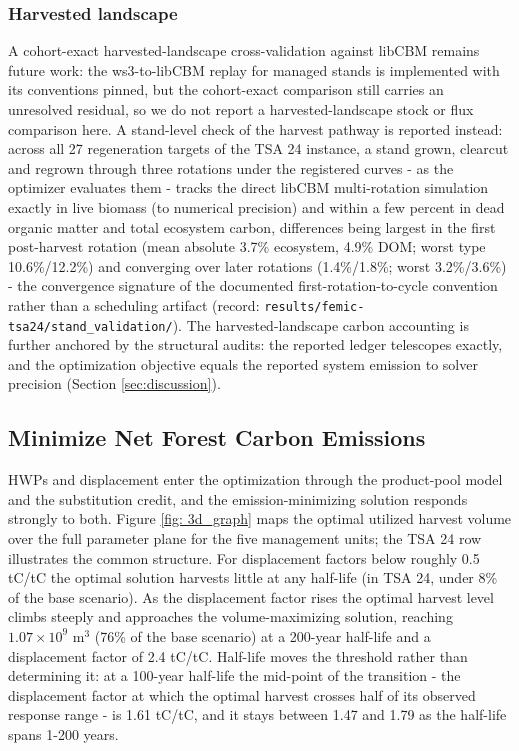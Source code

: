 \documentclass[preprint,12pt,authoryear]{elsarticle}
\begin{document}
\begin{linenumbers}
\subsubsection{Harvested landscape}
A cohort-exact harvested-landscape cross-validation against libCBM remains future work: the ws3-to-libCBM replay for managed stands is implemented with its conventions pinned, but the cohort-exact comparison still carries an unresolved residual, so we do not report a harvested-landscape stock or flux comparison here. A stand-level check of the harvest pathway is reported instead: across all 27 regeneration targets of the TSA 24 instance, a stand grown, clearcut and regrown through three rotations under the registered curves - as the optimizer evaluates them - tracks the direct libCBM multi-rotation simulation exactly in live biomass (to numerical precision) and within a few percent in dead organic matter and total ecosystem carbon, differences being largest in the first post-harvest rotation (mean absolute 3.7\% ecosystem, 4.9\% \ac{DOM}; worst type 10.6\%/12.2\%) and converging over later rotations (1.4\%/1.8\%; worst 3.2\%/3.6\%) - the convergence signature of the documented first-rotation-to-cycle convention rather than a scheduling artifact (record: \texttt{results/femic-tsa24/stand\_validation/}). The harvested-landscape carbon accounting is further anchored by the structural audits: the reported ledger telescopes exactly, and the optimization objective equals the reported system emission to solver precision (Section \ref{sec:discussion}).

\subsection{Minimize Net Forest Carbon Emissions}

\acp{HWP} and displacement enter the optimization through the product-pool model and the substitution credit, and the emission-minimizing solution responds strongly to both. Figure \ref{fig: 3d_graph} maps the optimal utilized harvest volume over the full parameter plane for the five management units; the TSA 24 row illustrates the common structure. For displacement factors below roughly 0.5 tC/tC the optimal solution harvests little at any half-life (in TSA 24, under 8\% of the base scenario). As the displacement factor rises the optimal harvest level climbs steeply and approaches the volume-maximizing solution, reaching $1.07\times10^9$ m$^3$ (76\% of the base scenario) at a 200-year half-life and a displacement factor of 2.4 tC/tC. Half-life moves the threshold rather than determining it: at a 100-year half-life the mid-point of the transition - the displacement factor at which the optimal harvest crosses half of its observed response range - is 1.61 tC/tC, and it stays between 1.47 and 1.79 as the half-life spans 1-200 years.


\end{linenumbers}
\end{document}
